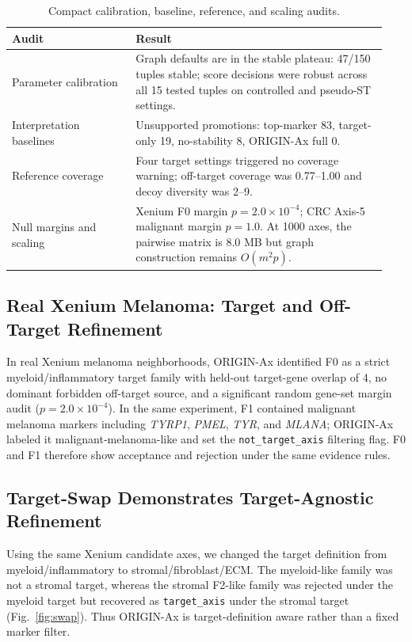 \documentclass[conference]{IEEEtran}
\begin{document}
\begin{table}[!t]
\caption{Compact calibration, baseline, reference, and scaling audits.}
\label{tab:robustness}
\centering
\scriptsize
\setlength{\tabcolsep}{2pt}
\begin{tabular}{p{0.31\linewidth}p{0.63\linewidth}}
\toprule
Audit & Result \\
\midrule
Parameter calibration &
Graph defaults are in the stable plateau: 47/150 tuples stable; score decisions
were robust across all 15 tested tuples on controlled and pseudo-ST settings. \\
Interpretation baselines &
Unsupported promotions: top-marker 83, target-only 19, no-stability 8,
ORIGIN-Ax full 0. \\
Reference coverage &
Four target settings triggered no coverage warning; off-target coverage was
0.77--1.00 and decoy diversity was 2--9. \\
Null margins and scaling &
Xenium F0 margin $p=2.0{\times}10^{-4}$; CRC Axis-5 malignant margin $p=1.0$.
At 1000 axes, the pairwise matrix is 8.0 MB but graph construction remains
$O(m^2p)$. \\
\bottomrule
\end{tabular}
\setlength{\tabcolsep}{6pt}
\end{table}

\subsection{Real Xenium Melanoma: Target and Off-Target Refinement}

In real Xenium melanoma neighborhoods, ORIGIN-Ax identified F0 as a strict
myeloid/inflammatory target family with held-out target-gene overlap of 4, no
dominant forbidden off-target source, and a significant random gene-set margin
audit ($p=2.0\times 10^{-4}$). In the same experiment, F1 contained malignant
melanoma markers including \textit{TYRP1}, \textit{PMEL}, \textit{TYR}, and
\textit{MLANA}; ORIGIN-Ax labeled it malignant-melanoma-like and set the
\texttt{not\_target\_axis} filtering flag. F0 and F1 therefore show acceptance
and rejection under the same evidence rules.

\subsection{Target-Swap Demonstrates Target-Agnostic Refinement}

Using the same Xenium candidate axes, we changed the target definition from
myeloid/inflammatory to stromal/fibroblast/ECM. The myeloid-like family was not
a stromal target, whereas the stromal F2-like family was rejected under the
myeloid target but recovered as \texttt{target\_axis} under the stromal target
(Fig.~\ref{fig:swap}). Thus ORIGIN-Ax is target-definition aware rather than a
fixed marker filter.
\end{document}
